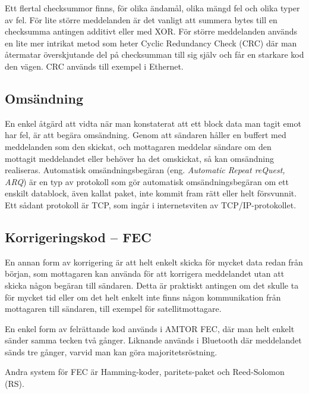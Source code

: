 Ett flertal checksummor finns, för olika ändamål, olika mängd fel och olika
typer av fel.
För lite större meddelanden är det vanligt att summera bytes till en checksumma
antingen additivt eller med XOR.
För större meddelanden används en lite mer intrikat metod som heter Cyclic
Redundancy Check (CRC) där man återmatar överskjutande del på checksumman till
sig själv och får en starkare kod den vägen.
CRC används till exempel i Ethernet.

\subsection{Omsändning}

En enkel åtgärd att vidta när man konstaterat att ett block data man tagit emot
har fel, är att begära omsändning.
Genom att sändaren håller en buffert med meddelanden som den skickat, och
mottagaren meddelar sändare om den mottagit meddelandet eller behöver ha det
omskickat, så kan omsändning realiseras.
Automatisk omsändningsbegäran (eng. \emph{Automatic Repeat reQuest, ARQ}) är en
typ av protokoll som gör automatisk omsändningsbegäran om ett enskilt datablock,
även kallat paket, inte kommit fram rätt eller helt försvunnit.
Ett sådant protokoll är TCP, som ingår i internetsviten av TCP/IP-protokollet.

\subsection{Korrigeringskod -- FEC}

En annan form av korrigering är att helt enkelt skicka för mycket data redan
från början, som mottagaren kan använda för att korrigera meddelandet utan att
skicka någon begäran till sändaren.
Detta är praktiskt antingen om det skulle ta för mycket tid eller om det helt
enkelt inte finns någon kommunikation från mottagaren till sändaren, till
exempel för satellitmottagare.

En enkel form av felrättande kod används i AMTOR FEC, där man helt enkelt
sänder samma tecken två gånger.
Liknande används i Bluetooth där meddelandet sänds tre gånger, varvid man kan
göra majoritetsröstning.

Andra system för FEC är Hamming-koder, paritets-paket och Reed-Solomon (RS).
